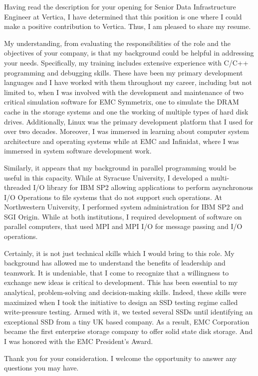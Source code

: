 \documentclass[busletter,dateno]{newlfm}
\begin{document}
\begin{newlfm}
Having read the description for your opening for Senior Data Infrastructure
Engineer at Vertica, I have determined that this 
position is one where I could make a positive contribution to Vertica.
Thus, I am pleased to share my resume.

My understanding, from evaluating the responsibilities of the role and the
objectives of your company, is that my background could be helpful in
addressing your needs. Specifically, my training includes extensive experience
with C/C++ programming and debugging skills. These have been my primary
development languages and I have worked with them throughout my career,
including but not limited to, when I was involved with the development and
maintenance of two critical simulation software for EMC Symmetrix, one to
simulate the DRAM cache in the storage systems and one the working of multiple
types of hard disk drives. Additionally, Linux was the primary development
platform that I used for over two decades. Moreover, I was immersed in
learning about computer system architecture and operating systems while at EMC
and Infinidat, where I was immersed in system software development work. 

Similarly, it appears that my background in parallel programming would be
useful in this capacity. While at Syracuse University, I developed a
multi-threaded I/O library for IBM SP2 allowing applications to perform
asynchronous I/O Operations to file systems that do not support such operations.
At Northwestern University, I performed system administration for IBM SP2 and
SGI Origin. While at both institutions, I required development of software on
parallel computers, that used MPI and MPI I/O for message passing and
I/O operations. 

Certainly, it is not just technical skills which I would bring to this role.
My background has allowed me to understand the benefits of leadership and
teamwork. It is undeniable, that I come to recognize that a willingness to
exchange new ideas is critical to development. This has been essential to my
analytical, problem-solving and decision-making skills. Indeed, these skills
were maximized when I took the initiative to design an SSD testing regime
called write-pressure testing. Armed with it, we tested several SSDs until
identifying an exceptional SSD from a tiny UK based company. As a result,
EMC Corporation became the first enterprise storage company to offer solid 
state disk storage. And I was honored with the EMC President's Award.

Thank you for your consideration.  I welcome the opportunity to answer any
questions you may have. 
\end{newlfm}
\end{document}
